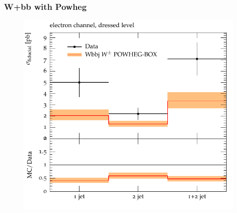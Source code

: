 \documentclass[11pt]{cernrep} \usepackage{graphicx,epsfig} 
\begin{document}
\subsubsection{W+bb with Powheg}

\begin{figure}[htbp]
   \includegraphics[scale=0.5]{figs/wbb/d01-x01-y01.pdf}
\end{figure}
\end{document}
